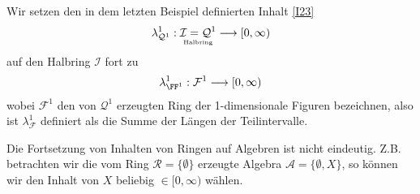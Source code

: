 \begin{example}
Wir setzen den in dem letzten Beispiel definierten Inhalt \eqref{I23}
\begin{equation*}
\lambda^1_{\mathcal{Q}^1}: \underset{\text{\tiny{Halbring}}}{\mathcal{I} = \mathcal{Q}^1} \longrightarrow [0,\infty)
\end{equation*} auf den Halbring $\mathcal{I}$ fort zu
\begin{equation*}
\lambda^1_{\FF^1}:\mathcal{F}^1 \longrightarrow [0,\infty)
\end{equation*}
wobei $\mathcal{F}^1$ den von $\mathcal{Q}^1$ erzeugten Ring der 1-dimensionale Figuren bezeichnen, also ist $\lambda^1_{\mathcal{F}}$ definiert als die Summe der Längen der Teilintervalle.
\end{example}
\begin{remark}
Die Fortsetzung von Inhalten von Ringen auf Algebren ist nicht eindeutig. Z.B. betrachten wir die vom Ring $\mathcal{R}=\{ \emptyset\}$ erzeugte Algebra $\mathcal{A} = \{ \emptyset, X\}$, so können wir den Inhalt von $X$ beliebig $\in [0,\infty)$ wählen.
\end{remark}
